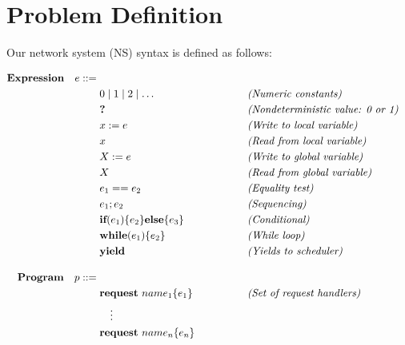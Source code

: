 
\section{Problem Definition}
\label{sec:problem-definition}

Our network system (NS) syntax is defined as follows: 

\[
\begin{aligned}
	\mathbf{Expression}\quad e ::={}&{} \\
	&0 \mid 1 \mid 2 \mid \dots 
	&&\qquad\qquad\emph{(Numeric constants)}\\
	&\textbf{?}
	&&\qquad\qquad\emph{(Nondeterministic value: 0 or 1)}\\
	&x := e
	&&\qquad\qquad\emph{(Write to local variable)}\\
	&x
	&&\qquad\qquad\emph{(Read from local variable)}\\
	&X := e
	&&\qquad\qquad\emph{(Write to global variable)}\\
	&X
	&&\qquad\qquad\emph{(Read from global variable)}\\
	&e_1 == e_2
	&&\qquad\qquad\emph{(Equality test)}\\
	&e_1 ; e_2
	&&\qquad\qquad\emph{(Sequencing)}\\
	&\textbf{if}(e_1)\{e_2\}\textbf{else}\{e_3\}
	&&\qquad\qquad\emph{(Conditional)}\\
	&\textbf{while}(e_1)\{e_2\}
	&&\qquad\qquad\emph{(While loop)}\\
	&\textbf{yield}
	&&\qquad\qquad\emph{(Yields to scheduler)}\\[1em]
	\mathbf{Program}\quad p ::={}&{} \\
	&\textbf{request}\ name_1\{e_1\}
	&&\qquad\qquad\emph{(Set of request handlers)}\\
	&\quad\vdots\\
	&\textbf{request}\ name_n\{e_n\}
\end{aligned}
\]

